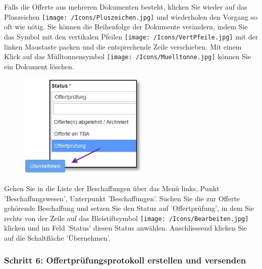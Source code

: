 \vspace{\baselineskip}

Falls die Offerte aus mehreren Dokumenten besteht, klicken Sie wieder auf das Pluszeichen \texttt{[image: /Icons/Pluszeichen.jpg]}  und wiederholen den Vorgang so oft wie nötig. Sie können die Reihenfolge der Dokumente verändern, indem Sie das Symbol mit den vertikalen Pfeilen \texttt{[image: /Icons/VertPfeile.jpg]}  mit der linken Maustaste packen und die entsprechende Zeile verschieben. Mit einem Klick auf das Mülltonnensymbol \texttt{[image: /Icons/Muelltonne.jpg]}  können Sie ein Dokument löschen.

\vspace{\baselineskip}

\begin{figure}
\vspace{-15pt}
\includegraphics[height=50mm]{../chapters/08_Beschaffungswesen/pictures/7-1-5_Offertpruefung.jpg}
\end{figure}
Gehen Sie in die Liste der Beschaffungen über das Menü links, Punkt 'Beschaffungswesen', Unterpunkt 'Beschaffungen'. Suchen Sie die zur Offerte gehörende Beschaffung und setzen Sie den Status auf 'Offertprüfung', in dem Sie rechts von der Zeile auf das Bleistiftsymbol \texttt{[image: /Icons/Bearbeiten.jpg]} klicken und im Feld 'Status' diesen Status anwählen. Anschliessend klicken Sie auf die Schaltfläche 'Übernehmen'.

\vspace{\baselineskip}

\pagebreak
\subsubsection{Schritt 6: Offertprüfungsprotokoll erstellen und versenden}


